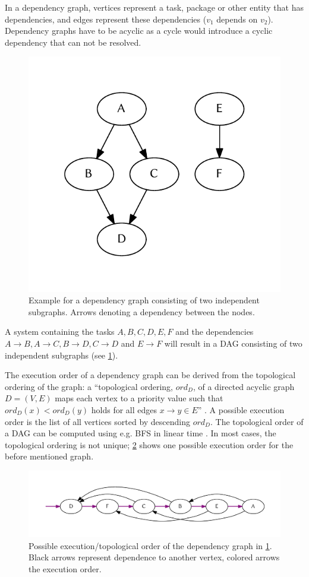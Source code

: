  In a dependency graph, vertices represent a task, package or other entity that has dependencies, and edges represent these dependencies ($v_1$ depends on $v_2$). Dependency graphs have to be acyclic as a cycle would introduce a cyclic dependency that can not be resolved.

  \begin{figure}[!htb]
    \centering
    \includegraphics[width = 0.44694533762057875\linewidth]{figures/unordered-graph.pdf}
    \caption{\label{fig:graph:unordered}Example for a dependency graph consisting of two independent subgraphs. Arrows denoting a dependency between the nodes.}
  \end{figure}

  A system containing the tasks $A, B, C, D, E, F$ and the dependencies $A\rightarrow B, A\rightarrow C, B\rightarrow D, C\rightarrow D$ and $E\rightarrow F$ will result in a \ac{DAG} consisting of two independent subgraphs (see \cref{fig:graph:unordered}).

  The execution order of a dependency graph can be derived from the topological ordering of the graph: a ``topological ordering, $ord_D$, of a directed acyclic graph $D = (V, E)$ maps each vertex to a priority value such that $ord_{D}(x) < ord_{D}(y)$ holds for all edges $x \rightarrow y \in E$'' \citep{pearce2007dynamic}. A possible execution order is the list of all vertices sorted by descending $ord_D$. The topological order of a \ac{DAG} can be computed using e.g. \ac{BFS} in linear time \citep{cormen2001introduction}. In most cases, the topological ordering is not unique; \cref{fig:graph:ordered} shows one possible execution order for the before mentioned graph.

  \begin{figure}[!htb]
    \centering
    \includegraphics[width = 1\linewidth]{figures/ordered-graph.pdf}
    \caption{\label{fig:graph:ordered}Possible execution/topological order of the dependency graph in \cref{fig:graph:unordered}. Black arrows represent dependence to another vertex, colored arrows the execution order.}
  \end{figure}

